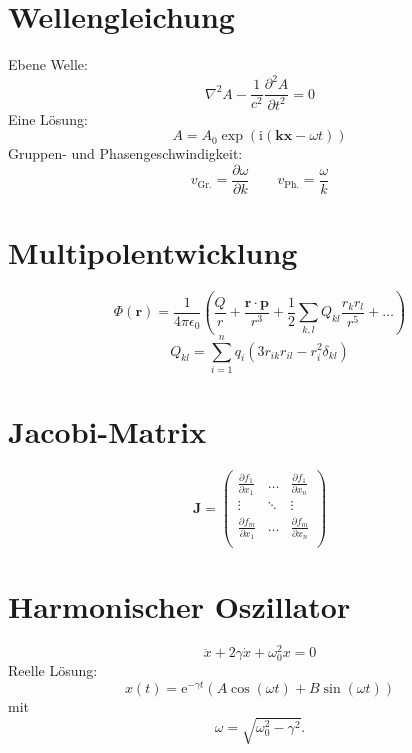 \documentclass{scrartcl}
\begin{document}
\section{Wellengleichung}
Ebene Welle:
\begin{equation}
  \nabla^2 A - \frac{1}{c^2} \frac{\partial^2 A}{\partial t^2} = 0
\end{equation}
Eine Lösung:
\begin{equation}
  A = A_0 \exp(\mathrm{i} (\mathbf{k} \mathbf{x} - \omega t))
\end{equation}
Gruppen- und Phasengeschwindigkeit:
\begin{equation}
  v_\text{Gr.} = \frac{\partial \omega}{\partial k} \qquad v_\text{Ph.} = \frac{\omega}{k}
\end{equation}

\section{Multipolentwicklung}
\begin{equation}
  \Phi(\mathbf{r}) = \frac{1}{4\pi\epsilon_0}\left(\frac{Q}{r} +
  \frac{\mathbf{r} \cdot \mathbf{p}}{r^3} + \frac{1}{2} \sum_{k, l} Q_{kl} \frac{r_k r_l}{r^5} + \dots\right)
\end{equation}
\begin{equation*}
  Q_{kl} = \sum_{i = 1}^n q_i \left(3 r_{ik} r_{il} - r_i^2 \delta_{kl}\right)
\end{equation*}

\section{Jacobi-Matrix}
\begin{equation}
  \mathbf{J} =
  \begin{pmatrix}
    \frac{\partial f_1}{\partial x_1} & \dots  & \frac{\partial f_1}{\partial x_n} \\
    \vdots                            & \ddots & \vdots                            \\
    \frac{\partial f_m}{\partial x_1} & \dots  & \frac{\partial f_m}{\partial x_n} \\
  \end{pmatrix}
\end{equation}

\section{Harmonischer Oszillator}
\begin{equation}
  \ddot{x} + 2 \gamma \dot{x} + \omega_0^2 x = 0 
\end{equation}
Reelle Lösung:
\begin{equation}
  x(t) = \mathup{e}^{-\gamma t} (A \cos(\omega t) + B \sin(\omega t))
\end{equation}
mit
\begin{equation}
  \omega = \sqrt{\omega_0^2 - \gamma^2} .
\end{equation}
\end{document}
